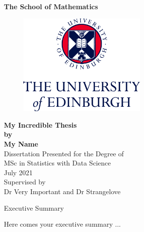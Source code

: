\documentclass[
  11pt,
  twoside,
  11pt]{article}
\author{}
\date{\vspace{-2.5em}}
\numberwithin{Theorem}{section}
\numberwithin{Definition}{section}
\numberwithin{Lemma}{section}
\numberwithin{Algorithm}{section}
\numberwithin{equation}{section}
\begin{document}
\pagestyle{empty}

\begin{titlepage}
\vspace*{.5em}
\center
\textbf{\Large{The School of Mathematics}} \\
\vspace*{1em}
\begin{figure}[!h]
\centering
\includegraphics[width=180pt]{CentredLogoCMYK.jpg}
\end{figure}
\vspace{2em}
\textbf{\Huge{My Incredible Thesis}}\\[2em]
\textbf{\LARGE{by}}\\
\vspace{2em}
\textbf{\LARGE{My Name}}\\
\vspace{6.5em}
\Large{Dissertation Presented for the Degree of\\
MSc in Statistics with Data Science}\\
\vspace{6.5em}
\Large{July 2021}\\
\vspace{3em}
\Large{Supervised by\\Dr Very Important and Dr Strangelove}
\vfill
\end{titlepage}

\cleardoublepage

\begin{center}
\Large{Executive Summary}
\end{center}

Here comes your executive summary ...
\end{document}
